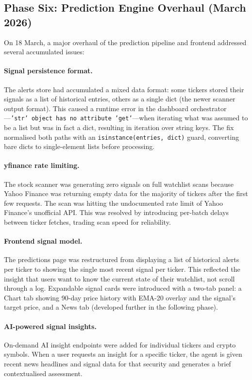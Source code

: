 \documentclass[12pt,a4paper]{article}
\begin{document}
\subsection{Phase Six: Prediction Engine Overhaul (March 2026)}

On 18 March, a major overhaul of the prediction pipeline and frontend addressed several accumulated issues:

\paragraph{Signal persistence format.} The alerts store had accumulated a mixed data format: some tickers stored their signals as a list of historical entries, others as a single dict (the newer scanner output format). This caused a runtime error in the dashboard orchestrator---\texttt{'str' object has no attribute 'get'}---when iterating what was assumed to be a list but was in fact a dict, resulting in iteration over string keys. The fix normalised both paths with an \texttt{isinstance(entries, dict)} guard, converting bare dicts to single-element lists before processing.

\paragraph{yfinance rate limiting.} The stock scanner was generating zero signals on full watchlist scans because Yahoo Finance was returning empty data for the majority of tickers after the first few requests. The scan was hitting the undocumented rate limit of Yahoo Finance's unofficial API. This was resolved by introducing per-batch delays between ticker fetches, trading scan speed for reliability.

\paragraph{Frontend signal model.} The predictions page was restructured from displaying a list of historical alerts per ticker to showing the single most recent signal per ticker. This reflected the insight that users want to know the current state of their watchlist, not scroll through a log. Expandable signal cards were introduced with a two-tab panel: a Chart tab showing 90-day price history with EMA-20 overlay and the signal's target price, and a News tab (developed further in the following phase).

\paragraph{AI-powered signal insights.} On-demand AI insight endpoints were added for individual tickers and crypto symbols. When a user requests an insight for a specific ticker, the agent is given recent news headlines and signal data for that security and generates a brief contextualised assessment.
\end{document}
